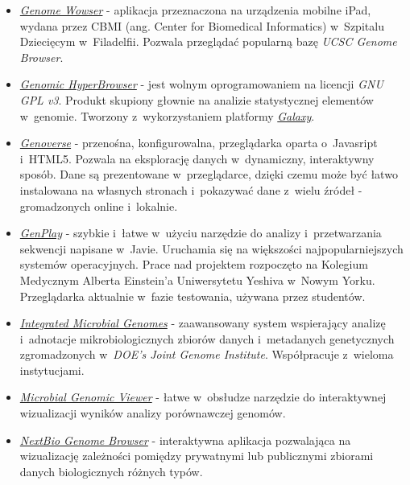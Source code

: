 \documentclass[a4paper,12pt,oneside]{mwrep}  %
\begin{document}
\begin{itemize}
\item \href{http://www.popsci.com/science/article/2011-06/introducing-genome-wowser-ipad-app-lets-you-browse-human-genome}{\emph{Genome Wowser}} - aplikacja przeznaczona na urządzenia mobilne iPad, wydana przez CBMI (ang. Center for Biomedical Informatics) w~Szpitalu Dziecięcym w~Filadelfii. Pozwala przeglądać popularną bazę \emph{UCSC Genome Browser}.

\item \href{https://hyperbrowser.uio.no/hb/}{\emph{Genomic HyperBrowser}} - jest wolnym oprogramowaniem na licencji \emph{GNU GPL v3}. Produkt skupiony głownie na analizie statystycznej elementów w~genomie. Tworzony z~wykorzystaniem platformy \href{https://en.wikipedia.org/wiki/Galaxy_(computational_biology)}{\emph{Galaxy}}.

\item \href{http://wtsi-web.github.io/Genoverse/}{\emph{Genoverse}} - przenośna, konfigurowalna, przeglądarka oparta o~Javasript i~HTML5. Pozwala na eksplorację danych w~dynamiczny, interaktywny sposób. Dane są prezentowane w~przeglądarce, dzięki czemu może być łatwo instalowana na własnych stronach i~pokazywać dane z~wielu źródeł - gromadzonych online i~lokalnie.

\item \href{http://genplay.einstein.yu.edu/}{\emph{GenPlay}} - szybkie i~łatwe w~użyciu narzędzie do analizy i~przetwarzania sekwencji napisane w~Javie. Uruchamia się na większości najpopularniejszych systemów operacyjnych. Prace nad projektem rozpoczęto na Kolegium Medycznym Alberta Einstein'a Uniwersytetu Yeshiva w~Nowym Yorku. Przeglądarka aktualnie w~fazie testowania, używana przez studentów.

\item \href{http://img.jgi.doe.gov/}{\emph{Integrated Microbial Genomes}} - zaawansowany system wspierający analizę i~adnotacje mikrobiologicznych zbiorów danych i~metadanych genetycznych zgromadzonych w~\emph{DOE's Joint Genome Institute}. Współpracuje z~wieloma instytucjami.

\item \href{http://mgv2.cmbi.ru.nl/}{\emph{Microbial Genomic Viewer}} - łatwe w~obsłudze narzędzie do interaktywnej wizualizacji wyników analizy porównawczej genomów. 

\item \href{https://www.nextbio.com}{\emph{NextBio Genome Browser}} - interaktywna aplikacja pozwalająca na wizualizację zależności pomiędzy prywatnymi lub publicznymi zbiorami danych biologicznych różnych typów.


\end{itemize}
\end{document}
